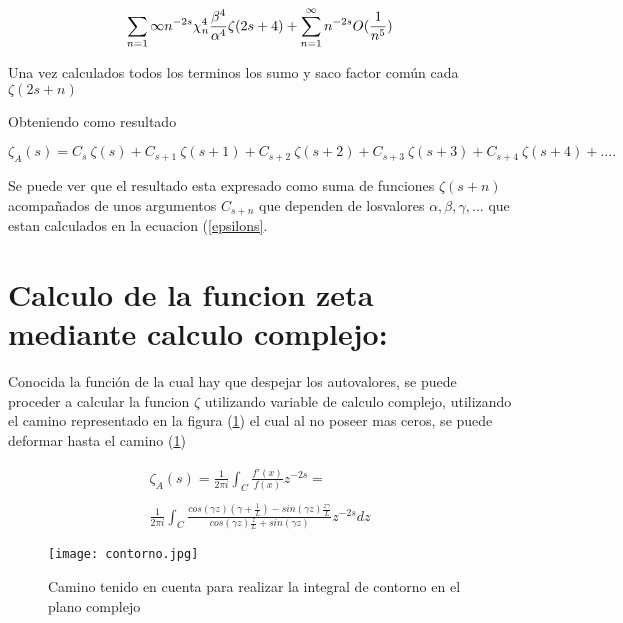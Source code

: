 \begin{equation}
\sum _{n=1} \infty n ^{-2s} \chi _n ^4 \\
\frac{\beta ^4}{\alpha ^4} \zeta (2s+4) + 
\sum _{n=1} ^{\infty} n ^{-2s} O( \frac{1}{n ^5} )
\end{equation}



Una vez calculados todos los terminos los sumo y saco factor común cada $\zeta( 2s+n )$


Obteniendo como resultado 

\begin{equation}
    \zeta _A (s) = 
    C _s \ \zeta (s) +
    C _{s+1} \ \zeta (s+1) + 
    C _{s+2} \ \zeta (s+2) +
    C _{s+3} \ \zeta (s+3) + 
    C _{s+4} \ \zeta (s+4) + ....
\end{equation}

Se puede ver que el resultado esta expresado como suma de funciones $\zeta (s+n)$ acompañados de unos argumentos $C_{s+n}$ que dependen de losvalores $\alpha,\beta,\gamma, ...$ que estan calculados en la ecuacion (\ref{epsilons}.

\section{Calculo de la funcion zeta mediante calculo complejo:}

Conocida la función de la cual hay que despejar los autovalores, se puede proceder a calcular la funcion $\zeta$ utilizando variable de calculo complejo, utilizando el camino representado en la figura (\ref{fig:contorno}) el cual al no poseer mas ceros, se puede deformar hasta el camino (\ref{fig:contorno}) 

\begin{equation}
\begin{array}{c}
   \zeta _A (s) =  \frac{1}{2 \pi i} \int _{C} \frac{f'(x)}{f(x)} z ^{-2s} = \\ 
   \\ 
    \frac{1}{2 \pi i} \int _{C}
    \frac{ cos(\gamma z) \left(\gamma + \frac{1}{L} \right) - sin(\gamma z) \frac{z \gamma}{L}
    }
    {cos(\gamma z) \frac{z}{L} + sin(\gamma z)
    }
    z ^{-2 s} dz
\end{array}
\end{equation}




\begin{figure}
\centering
\texttt{[image: contorno.jpg]}
\caption{Camino tenido en cuenta para realizar la integral de contorno en el plano complejo}
\label{fig:contorno}
\end{figure}



